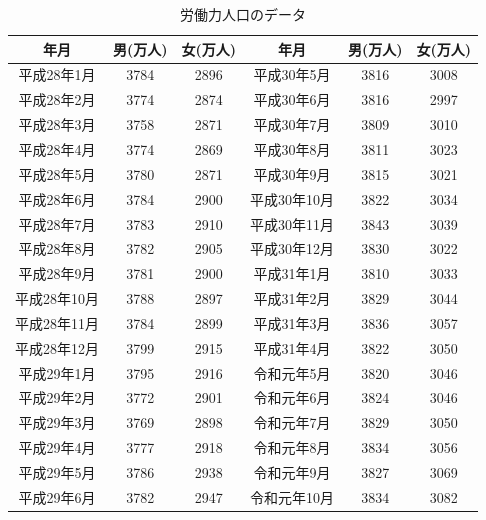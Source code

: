\documentclass[12pt]{jarticle}
\begin{document}
\clearpage
\begin{table}[htb]
    \begin{center}
        \caption{労働力人口のデータ}
        \begin{tabular}{|c|c|c||c|c|c|} \hline
            年月         & 男(万人) & 女(万人) & 年月         & 男(万人) & 女(万人) \\\hline
            平成28年1月  & 3784     & 2896     & 平成30年5月  & 3816     & 3008     \\
            平成28年2月  & 3774     & 2874     & 平成30年6月  & 3816     & 2997     \\
            平成28年3月  & 3758     & 2871     & 平成30年7月  & 3809     & 3010     \\
            平成28年4月  & 3774     & 2869     & 平成30年8月  & 3811     & 3023     \\
            平成28年5月  & 3780     & 2871     & 平成30年9月  & 3815     & 3021     \\
            平成28年6月  & 3784     & 2900     & 平成30年10月 & 3822     & 3034     \\
            平成28年7月  & 3783     & 2910     & 平成30年11月 & 3843     & 3039     \\
            平成28年8月  & 3782     & 2905     & 平成30年12月 & 3830     & 3022     \\
            平成28年9月  & 3781     & 2900     & 平成31年1月  & 3810     & 3033     \\
            平成28年10月 & 3788     & 2897     & 平成31年2月  & 3829     & 3044     \\
            平成28年11月 & 3784     & 2899     & 平成31年3月  & 3836     & 3057     \\
            平成28年12月 & 3799     & 2915     & 平成31年4月  & 3822     & 3050     \\
            平成29年1月  & 3795     & 2916     & 令和元年5月  & 3820     & 3046     \\
            平成29年2月  & 3772     & 2901     & 令和元年6月  & 3824     & 3046     \\
            平成29年3月  & 3769     & 2898     & 令和元年7月  & 3829     & 3050     \\
            平成29年4月  & 3777     & 2918     & 令和元年8月  & 3834     & 3056     \\
            平成29年5月  & 3786     & 2938     & 令和元年9月  & 3827     & 3069     \\
            平成29年6月  & 3782     & 2947     & 令和元年10月 & 3834     & 3082     \\

\end{tabular}
\end{center}
\end{table}
\end{document}
